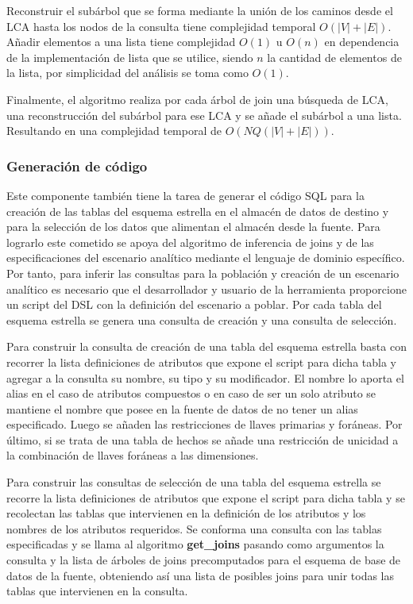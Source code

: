 Reconstruir el sub\'arbol que se forma mediante la uni\'on de los caminos desde el LCA hasta los nodos 
de la consulta tiene complejidad temporal $O(|V| + |E|)$. Añadir elementos a una lista tiene complejidad 
$O(1)$ u $O(n)$ en dependencia de la implementaci\'on de lista que se utilice, siendo $n$ la cantidad 
de elementos de la lista, por simplicidad del an\'alisis se toma como $O(1)$.

Finalmente, el algoritmo realiza por cada \'arbol de join una b\'usqueda de LCA, una reconstrucci\'on 
del sub\'arbol para ese LCA y se añade el sub\'arbol a una lista. Resultando en una complejidad 
temporal de $O(NQ(|V| + |E|))$.


\subsubsection{Generaci\'on de c\'odigo}

Este componente también tiene la tarea de generar el c\'odigo SQL para la creaci\'on de las 
tablas del esquema estrella en el almac\'en de datos de destino y para la selecci\'on de 
los datos que alimentan el almac\'en desde la fuente. Para lograrlo este cometido se apoya 
del algoritmo de inferencia de joins y de las especificaciones del escenario anal\'itico 
mediante el lenguaje de dominio espec\'ifico. Por tanto, para inferir las consultas para 
la población y creaci\'on de un escenario anal\'itico es necesario que el desarrollador y 
usuario de la herramienta proporcione un script del DSL con la definición del escenario 
a poblar. Por cada tabla del esquema estrella se genera una consulta de creaci\'on y una 
consulta de selecci\'on.

Para construir la consulta de creaci\'on de una tabla del esquema estrella basta con recorrer 
la lista definiciones de atributos que expone el script para dicha tabla y agregar a la consulta 
su nombre, su tipo y su modificador. 
El nombre lo aporta el alias en el caso de atributos compuestos o en caso de ser un solo atributo 
se mantiene el nombre que posee en la fuente de datos de no tener un alias especificado. Luego se 
añaden las restricciones de llaves primarias y for\'aneas. Por \'ultimo, si se trata de una tabla 
de hechos se añade una restricci\'on de unicidad a la combinaci\'on de llaves for\'aneas a las 
dimensiones.

Para construir las consultas de selecci\'on de una tabla del esquema estrella se recorre la 
lista definiciones de atributos que expone el script para dicha tabla y se recolectan las 
tablas que intervienen en la definición de los atributos y los nombres de los atributos requeridos.
Se conforma una consulta con las tablas especificadas y se llama al algoritmo \textbf{get\_joins} 
pasando como argumentos la consulta y la lista de \'arboles de joins precomputados para el esquema 
de base de datos de la fuente, obteniendo as\'i una lista de posibles joins para unir todas las 
tablas que intervienen en la consulta.

